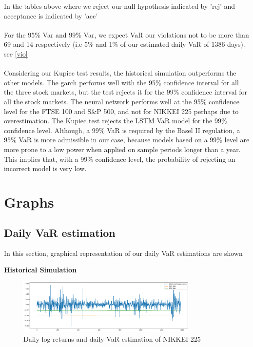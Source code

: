 \documentclass[a4paper,11pt,oneside]{book}
\begin{document}
In the tables above where we reject our null hypothesis indicated by 'rej' and acceptance is indicated by 'acc'\\\\
For the 95\% Var and 99\% Var, we expect VaR our violations not to be more than 69 and 14 respectively (i.e 5\% and 1\% of our estimated daily VaR of 1386 days). see \autoref{vio}  \\\\
Considering our Kupiec test results, the historical simulation outperforms the other models. The garch performs well with the 95\% confidence interval for all the three stock markets, but the test rejects it for the 99\% confidence interval for all the stock markets. The neural network performs well at the 95\% confidence level for the FTSE 100 and S\&P 500, and not for NIKKEI 225 perhaps due to overestimation. The Kupiec test rejects the LSTM VaR model for the 99\% confidence level. Although, a 99\% VaR
is required by the Basel II regulation, a 95\% VaR is more admissible in our case,
because models based on a 99\% level are more prone to a low power when
applied on sample periods longer than a year. This implies that, with a 99\%
confidence level, the probability of rejecting an incorrect model is very low.























\section{Graphs}
\subsection{Daily VaR estimation}
In this section, graphical representation of our daily VaR estimations are shown \newline

\textbf{Historical Simulation}
\begin{figure}[!h]
	\centering
	\includegraphics[width=0.8\textwidth]{figures/HISTN}
	\caption{Daily log-returns and daily VaR estimation of NIKKEI 225}
	\label{HistN}
\end{figure}
\end{document}
